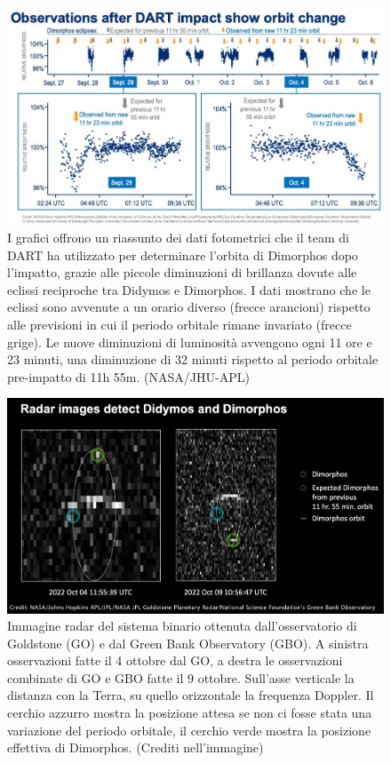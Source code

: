 \begin{figure}
    \centering
    \includegraphics[width=\textwidth]{figure/impact_lightcurve.jpg}
    \caption[Riassunto dei dati fotometrici utilizzati per determinare l'orbita post-impatto.]{I grafici offrono un riassunto dei dati fotometrici che il team di DART ha utilizzato per determinare l'orbita di Dimorphos dopo l'impatto, grazie alle piccole diminuzioni di brillanza dovute alle eclissi reciproche tra Didymos e Dimorphos. I dati mostrano che le eclissi sono avvenute a un orario diverso (frecce arancioni) rispetto alle previsioni in cui il periodo orbitale rimane invariato (frecce grige). Le nuove diminuzioni di luminosità avvengono ogni 11 ore e 23 minuti, una diminuzione di 32 minuti rispetto al periodo orbitale pre-impatto di 11h 55m. (NASA/JHU-APL)}
    \label{fig:impact_lightcurve}
\end{figure}

\begin{figure}
    \centering
    \includegraphics[scale=0.25]{figure/expected_dimorphos.png}
    \caption[Immagine radar del sistema post-impatto.]{Immagine radar del sistema binario ottenuta dall'osservatorio di Goldstone (GO) e dal Green Bank Observatory (GBO). A sinistra osservazioni fatte il 4 ottobre dal GO, a destra le osservazioni combinate di GO e GBO fatte il 9 ottobre. Sull'asse verticale la distanza con la Terra, su quello orizzontale la frequenza Doppler. Il cerchio azzurro mostra la posizione attesa se non ci fosse stata una variazione del periodo orbitale, il cerchio verde mostra la posizione effettiva di Dimorphos. (Crediti nell'immagine)}
    \label{fig:expected_dimorphos}
\end{figure}

